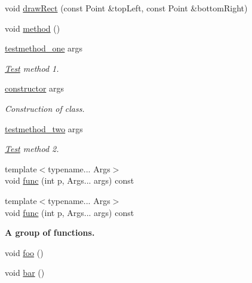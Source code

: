 \begin{DoxyCompactItemize}
\item 
void \mbox{\hyperlink{class_test_a78e721f2e24a135158b9bd4c256d537e}{draw\+Rect}} (const Point \&top\+Left, const Point \&bottom\+Right)
\item 
void \mbox{\hyperlink{class_test_a2a91524f180391310e4e2735599b3f18}{method}} ()
\item 
\mbox{\label{class_test_a39186c5612153980286c3c02fd922060}} 
\mbox{\hyperlink{class_test_a39186c5612153980286c3c02fd922060}{testmethod\+\_\+one}} args
\begin{DoxyCompactList}\small\item\em \mbox{\hyperlink{class_test}{Test}} method 1. \end{DoxyCompactList}\item 
\mbox{\label{class_test_a6e6c96de46eb90f3ad9f5f5106dfa0b9}} 
\mbox{\hyperlink{class_test_a6e6c96de46eb90f3ad9f5f5106dfa0b9}{constructor}} args
\begin{DoxyCompactList}\small\item\em Construction of class. \end{DoxyCompactList}\item 
\mbox{\label{class_test_ae994ed622fec42a183b5bf5545b9769c}} 
\mbox{\hyperlink{class_test_ae994ed622fec42a183b5bf5545b9769c}{testmethod\+\_\+two}} args
\begin{DoxyCompactList}\small\item\em \mbox{\hyperlink{class_test}{Test}} method 2. \end{DoxyCompactList}\item 
{\footnotesize template$<$typename... Args$>$ }\\void \mbox{\hyperlink{class_test_a9c530a92e47e916f87c6eed72057d10a}{func}} (int p, Args... args) const
\item 
{\footnotesize template$<$typename... Args$>$ }\\void \mbox{\hyperlink{class_test_a9c530a92e47e916f87c6eed72057d10a}{func}} (int p, Args... args) const
\end{DoxyCompactItemize}
\begin{Indent}\textbf{ A group of functions.}\par
\begin{DoxyCompactItemize}
\item 
void \mbox{\hyperlink{class_test_a3296012eb76649622984234e2bb64a96}{foo}} ()
\item 
void \mbox{\hyperlink{class_test_a32a5254aa4ef1b634875e8680c76cc49}{bar}} ()
\end{DoxyCompactItemize}
\end{Indent}
